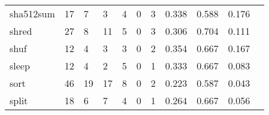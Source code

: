 \begin{longtable}{lp{1.20cm}p{1.20cm}p{1.20cm}p{1.20cm}p{1.20cm}p{1.20cm}p{1.20cm}p{1.20cm}p{1.20cm}p{1.20cm}}
sha512sum &                                    17 &                                                  7 &                                                  3 &                                                  4 &                                                  0 &                                                  3 &                                         0.338 &                                              0.588 &                                              0.176 \\
shred     &                                    27 &                                                  8 &                                                 11 &                                                  5 &                                                  0 &                                                  3 &                                         0.306 &                                              0.704 &                                              0.111 \\
shuf      &                                    12 &                                                  4 &                                                  3 &                                                  3 &                                                  0 &                                                  2 &                                         0.354 &                                              0.667 &                                              0.167 \\
sleep     &                                    12 &                                                  4 &                                                  2 &                                                  5 &                                                  0 &                                                  1 &                                         0.333 &                                              0.667 &                                              0.083 \\
sort      &                                    46 &                                                 19 &                                                 17 &                                                  8 &                                                  0 &                                                  2 &                                         0.223 &                                              0.587 &                                              0.043 \\
split     &                                    18 &                                                  6 &                                                  7 &                                                  4 &                                                  0 &                                                  1 &                                         0.264 &                                              0.667 &                                              0.056 \\

\end{longtable}
